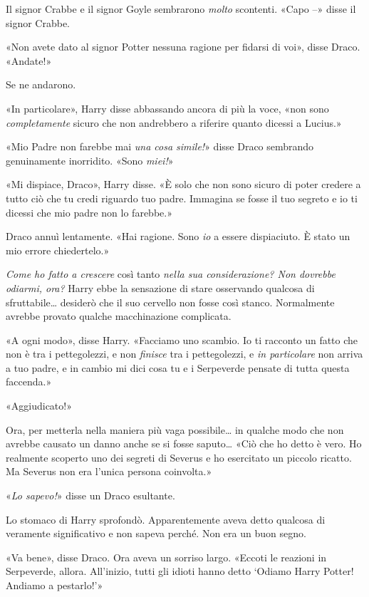 Il signor Crabbe e il signor Goyle sembrarono \textit{molto} scontenti. «Capo –» disse il signor Crabbe.

«Non avete dato al signor Potter nessuna ragione per fidarsi di voi», disse Draco. «Andate!»

Se ne andarono.

«In particolare», Harry disse abbassando ancora di più la voce, «non sono \textit{completamente} sicuro che non andrebbero a riferire quanto dicessi a Lucius.»

«Mio Padre non farebbe mai \textit{una cosa simile!}» disse Draco sembrando genuinamente inorridito. «Sono \textit{miei!}»

«Mi dispiace, Draco», Harry disse. «È solo che non sono sicuro di poter credere a tutto ciò che tu credi riguardo tuo padre. Immagina se fosse il tuo segreto e io ti dicessi che mio padre non lo farebbe.»

Draco annuì lentamente. «Hai ragione. Sono \textit{io} a essere dispiaciuto. È stato un mio errore chiedertelo.»

\textit{Come ho fatto a crescere} così tanto \textit{nella sua considerazione? Non dovrebbe odiarmi, ora?} Harry ebbe la sensazione di stare osservando qualcosa di sfruttabile… desiderò che il suo cervello non fosse così stanco. Normalmente avrebbe provato qualche macchinazione complicata.

«A ogni modo», disse Harry. «Facciamo uno scambio. Io ti racconto un fatto che non è tra i pettegolezzi, e non \textit{finisce} tra i pettegolezzi, e \textit{in particolare} non arriva a tuo padre, e in cambio mi dici cosa tu e i Serpeverde pensate di tutta questa faccenda.»

«Aggiudicato!»

Ora, per metterla nella maniera più vaga possibile… in qualche modo che non avrebbe causato un danno anche se si fosse saputo… «Ciò che ho detto è vero. Ho realmente scoperto uno dei segreti di Severus e ho esercitato un piccolo ricatto. Ma Severus non era l’unica persona coinvolta.»

«\textit{Lo sapevo!}» disse un Draco esultante.

Lo stomaco di Harry sprofondò. Apparentemente aveva detto qualcosa di veramente significativo e non sapeva perché. Non era un buon segno.

«Va bene», disse Draco. Ora aveva un sorriso largo. «Eccoti le reazioni in Serpeverde, allora. All’inizio, tutti gli idioti hanno detto ‘Odiamo Harry Potter! Andiamo a pestarlo!’»


